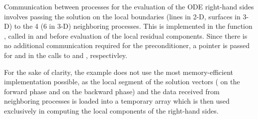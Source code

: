 Communication between processes for the evaluation of the ODE right-hand sides involves
passing the solution on the local boundaries (lines in 2-D, surfaces in 3-D) to 
the 4 (6 in 3-D) neighboring processes. This is implemented in the function 
, called in  and  before evaluation of the local residual 
components. Since there is no additional communication required for the {\cvbbdpre}
preconditioner, a  pointer is passed for  and  in the
calls to  and , respectivley.

For the sake of clarity, the  example does not use
the most memory-efficient implementation possible, as the local segment of the 
solution vectors ( on the forward phase and  on the backward phase)
and the data received from neighboring processes is loaded into a temporary 
array  which is then used exclusively in computing the local components
of the right-hand sides.

